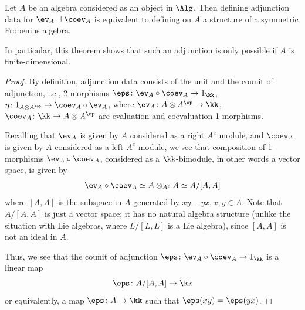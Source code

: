 \begin{theorem}\label{t:adjunction-frob}
  Let $A$ be an algebra considered as an object in $\Alg$. Then defining
  adjunction data for $\ev_A\dashv\coev_A$ is equivalent to defining on $A$ a
  structure of a symmetric Frobenius algebra.
\end{theorem}
In particular, this theorem shows that such an adjunction is only possible if
$A$ is finite-dimensional.
\begin{proof}

  By definition, adjunction data consists of the unit and the counit of adjunction, i.e.,
  2-morphisms $\eps \colon \ev_A\circ \coev_A \to 1_\kk$, $\eta \colon
  1_{A\otimes A^\op}\to \coev_A\circ \ev_A$, where $\ev_A\colon A\otimes
  A^\op\to\kk$, $\coev_A \colon \kk \to A\otimes A^\op$ are evaluation and
  coevaluation 1-morphisms.

  Recalling that $\ev_A$ is given by $A$ considered as a right $A^e$ module, and
  $\coev_A$ is given by $A$ considered as a left $A^e$ module, we see that
  composition of 1-morphisms $\ev_A \circ \coev_A$,
  considered as a $\kk$-bimodule, in other words a vector space, is given by
  $$
  \ev_A \circ \coev_A \simeq A\otimes_{A^e} A\simeq A/[A,A]
  $$
  where $[A,A]$ is the subspace in $A$ generated by $xy-yx, x,y\in A$.
  Note that $A/[A,A]$ is just a vector space; it has no natural algebra
  structure (unlike the situation with Lie algebras, where $L/[L,L]$ is
  a Lie algebra), since $[A,A]$ is not an ideal in $A$.


  Thus, we see that the counit of adjunction
  $\eps\colon \ev_A \circ \coev_A\to 1_\kk$
  is a linear map
  $$
    \eps\colon A/[A,A]\to \kk
  $$
  or equivalently, a map $\eps \colon A\to \kk$ such that $\eps(xy)=\eps(yx)$.


\end{proof}
